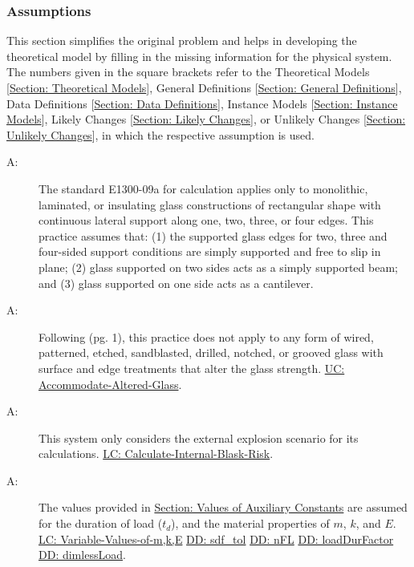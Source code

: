 \documentclass[12pt]{article}
\newcounter{assumpnum}
\newcommand{\atheassumpnum}{A\theassumpnum}
\begin{document}
\subsubsection{Assumptions}
\label{Sec:Assumps}
This section simplifies the original problem and helps in developing the theoretical model by filling in the missing information for the physical system. The numbers given in the square brackets refer to the Theoretical Models {[}\hyperref[Sec:TMs]{Section: Theoretical Models}{]}, General Definitions {[}\hyperref[Sec:GDs]{Section: General Definitions}{]}, Data Definitions {[}\hyperref[Sec:DDs]{Section: Data Definitions}{]}, Instance Models {[}\hyperref[Sec:IMs]{Section: Instance Models}{]}, Likely Changes {[}\hyperref[Sec:LCs]{Section: Likely Changes}{]}, or Unlikely Changes {[}\hyperref[Sec:UCs]{Section: Unlikely Changes}{]}, in which the respective assumption is used.
\begin{description}
\item[\atheassumpnum\label{A:glassType}:]The standard E1300-09a for calculation applies only to monolithic, laminated, or insulating glass constructions of rectangular shape with continuous lateral support along one, two, three, or four edges. This practice assumes that: (1) the supported glass edges for two, three and four-sided support conditions are simply supported and free to slip in plane; (2) glass supported on two sides acts as a simply supported beam; and (3) glass supported on one side acts as a cantilever.
\end{description}
\begin{description}
\item[\atheassumpnum\label{A:glassCondition}:]Following \cite{astm2009} (pg. 1), this practice does not apply to any form of wired, patterned, etched, sandblasted, drilled, notched, or grooved glass with surface and edge treatments that alter the glass strength. \hyperref[accAlteredGlass]{UC: Accommodate-Altered-Glass}.
\end{description}
\begin{description}
\item[\atheassumpnum\label{A:explainScenario}:]This system only considers the external explosion scenario for its calculations. \hyperref[calcInternalBlastRisk]{LC: Calculate-Internal-Blask-Risk}.
\end{description}
\begin{description}
\item[\atheassumpnum\label{A:standardValues}:]The values provided in \hyperref[Sec:AuxConstants]{Section: Values of Auxiliary Constants} are assumed for the duration of load (${t_{d}}$), and the material properties of $m$, $k$, and $E$. \hyperref[varValsOfmkE]{LC: Variable-Values-of-m,k,E} \hyperref[DD:sdf.tol]{DD: sdf\_tol} \hyperref[DD:nFL]{DD: nFL} \hyperref[DD:loadDurFactor]{DD: loadDurFactor} \hyperref[DD:dimlessLoad]{DD: dimlessLoad}.
\end{description}
\end{document}
